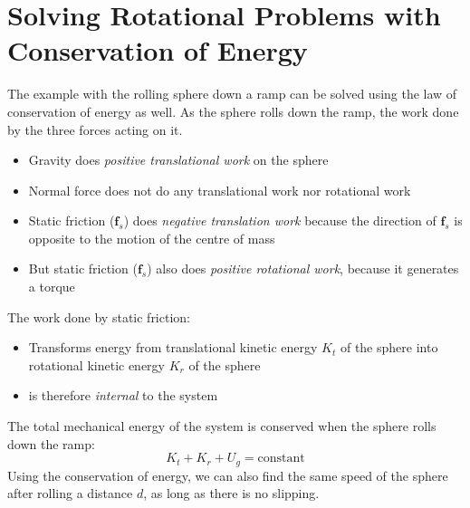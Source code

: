 \section{Solving Rotational Problems with Conservation of Energy}

The example with the rolling sphere down a ramp can be solved using the law of
conservation of energy as well. As the sphere rolls down the ramp, the work
done by the three forces acting on it.  
%    
\begin{itemize}
\item Gravity does \emph{positive translational work} on the sphere
\item Normal force does not do any translational work nor rotational work
\item Static friction ($\bm f_s$) does \emph{negative translation work}
  because the direction of $\bm f_s$ is opposite to the motion of the centre of mass
\item But static friction ($\bm f_s$) also does \emph{positive rotational
work}, because it generates a torque
\end{itemize}
%  
%
%    

The work done by static friction:
\begin{itemize}
\item Transforms energy from translational kinetic energy $K_t$ of the sphere
  into rotational kinetic energy $K_r$ of the sphere
\item is therefore \emph{internal} to the system
\end{itemize}
The total mechanical energy of the system is conserved when the sphere rolls
down the ramp:
\begin{equation}
  \boxed{
    K_t + K_r + U_g = \text{constant}
  }
\end{equation}
Using the conservation of energy, we can also find the same speed of the sphere
after rolling a distance $d$, as long as there is no slipping.
